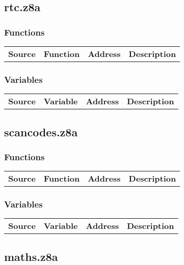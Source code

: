 \subsection{rtc.z8a}
\subsubsection{Functions}
\begin{tabular}{rllp{7cm}}
 \textbf{Source}&\textbf{Function}&\textbf{Address}&\textbf{Description}\\
\end{tabular}

\subsubsection{Variables}
\begin{tabular}{rllp{7cm}}
 \textbf{Source}&\textbf{Variable}&\textbf{Address}&\textbf{Description}\\
\end{tabular}

\subsection{scancodes.z8a}
\subsubsection{Functions}
\begin{tabular}{rllp{7cm}}
 \textbf{Source}&\textbf{Function}&\textbf{Address}&\textbf{Description}\\
\end{tabular}

\subsubsection{Variables}
\begin{tabular}{rllp{7cm}}
 \textbf{Source}&\textbf{Variable}&\textbf{Address}&\textbf{Description}\\
\end{tabular}

\subsection{maths.z8a}
